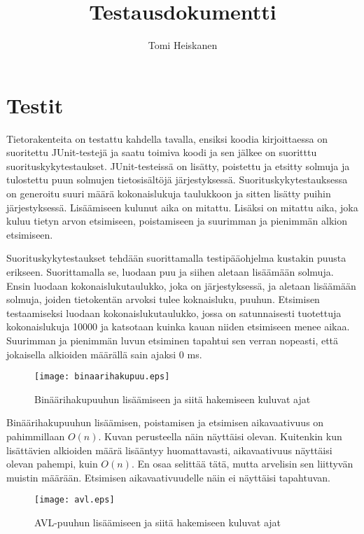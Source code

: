\documentclass[12pt,a4paper,leqno,titlepage]{article}
\begin{document}
\title{Testausdokumentti}
\author{Tomi Heiskanen}
\maketitle

\section*{Testit}

Tietorakenteita on testattu kahdella tavalla, ensiksi koodia kirjoittaessa on
suoritettu JUnit-testejä ja saatu toimiva koodi ja sen jälkee on suoritttu
suorituskykytestaukset. JUnit-testeissä on lisätty, poistettu ja etsitty solmuja
ja tulostettu puun solmujen tietosisältöjä järjestyksessä. Suorituskykytestauksessa
on generoitu suuri määrä kokonaislukuja taulukkoon ja sitten lisätty puihin järjestyksessä.
Lisäämiseen kulunut aika on mitattu. Lisäksi on mitattu aika, joka kuluu
tietyn arvon etsimiseen, poistamiseen ja suurimman ja pienimmän alkion etsimiseen.

Suorituskykytestaukset tehdään suorittamalla testipääohjelma kustakin puusta
erikseen. Suorittamalla se, luodaan puu ja siihen aletaan lisäämään solmuja. Ensin
luodaan kokonaislukutaulukko, joka on järjestyksessä, ja aletaan lisäämään solmuja,
joiden tietokentän arvoksi tulee koknaisluku, puuhun. Etsimisen testaamiseksi
luodaan kokonaislukutaulukko, jossa on satunnaisesti tuotettuja kokonaislukuja
10000 ja katsotaan kuinka kauan niiden etsimiseen menee aikaa. Suurimman ja
pienimmän luvun etsiminen tapahtui sen verran nopeasti, että jokaisella alkioiden
määrällä sain ajaksi 0 ms.

\begin{figure}[!h]
  \centering
  \texttt{[image: binaarihakupuu.eps]}\\
  \caption{Binäärihakupuuhun lisäämiseen ja siitä hakemiseen kuluvat ajat}
\end{figure}

Binäärihakupuuhun lisäämisen, poistamisen ja etsimisen aikavaativuus on pahimmillaan
$O(n)$. Kuvan perusteella näin näyttäisi olevan. Kuitenkin kun lisättävien alkioiden
määrä lisääntyy huomattavasti, aikavaativuus näyttäisi olevan pahempi, kuin $O(n)$. 
En osaa selittää tätä, mutta arvelisin sen liittyvän muistin määrään. Etsimisen
aikavaativuudelle näin ei näyttäisi tapahtuvan.

\begin{figure}[!h]
  \centering
  \texttt{[image: avl.eps]}\\
  \caption{AVL-puuhun lisäämiseen ja siitä hakemiseen kuluvat ajat}
\end{figure}
\end{document}
